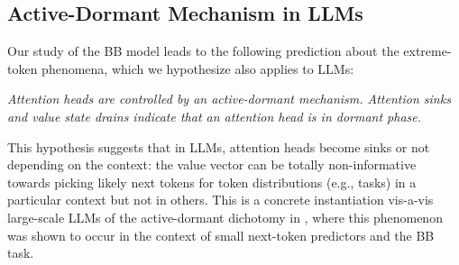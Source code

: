 

\subsection{Active-Dormant Mechanism in LLMs}\label{sub:active_dormant}

Our study of the BB model leads to the following prediction about the extreme-token phenomena, which we hypothesize also applies to LLMs:  
\begin{center}
    \textit{Attention heads are controlled by an active-dormant mechanism. Attention sinks and value state drains indicate that an attention head is in dormant phase.}
\end{center}

This hypothesis suggests that in LLMs, attention heads become sinks or not depending on the context: the value vector can be totally non-informative towards picking likely next tokens for token distributions (e.g., tasks) in a particular context but not in others. This is a concrete instantiation vis-a-vis large-scale LLMs of the active-dormant dichotomy in , where this phenomenon was shown to occur in the context of small next-token predictors and the BB task. 

